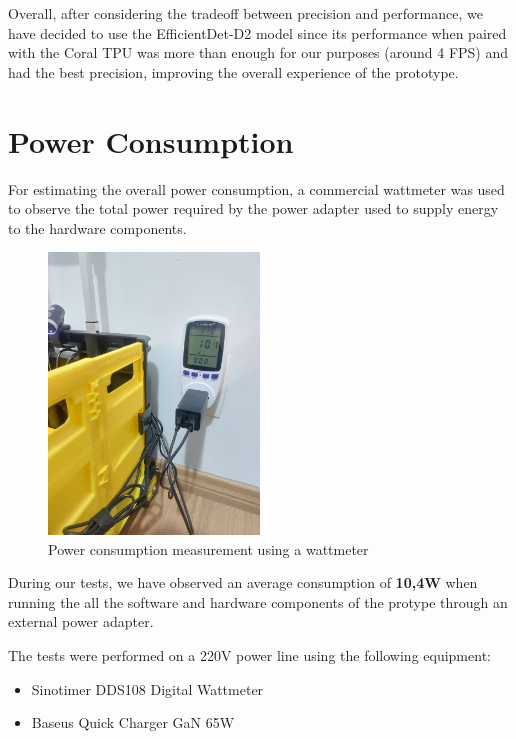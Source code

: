 \documentclass[openright]{normas-utf-tex} %
\begin{document}
Overall, after considering the tradeoff between precision and performance, we
have decided to use the EfficientDet-D2 model since its performance when paired
with the Coral TPU was more than enough for our purposes (around 4 FPS) and had
the best precision, improving the overall experience of the prototype.

\section{Power Consumption}

For estimating the overall power consumption, a commercial wattmeter was used
to observe the total power required by the power adapter used to supply energy
to the hardware components.

\begin{figure}[H]
	\centering
	\includegraphics[width=0.5\textwidth]{./images/powerconsumption.jpeg}
	\caption[Power consumption measurement using a wattmeter]{Power consumption measurement using a wattmeter}
\end{figure}

During our tests, we have observed an average consumption of \textbf{10,4W}
when running the all the software and hardware components of the protype
through an external power adapter. 

The tests were performed on a 220V power line using the following equipment:
\begin{itemize}
    \item Sinotimer DDS108 Digital Wattmeter
    \item Baseus Quick Charger GaN 65W
\end{itemize}
\end{document}
